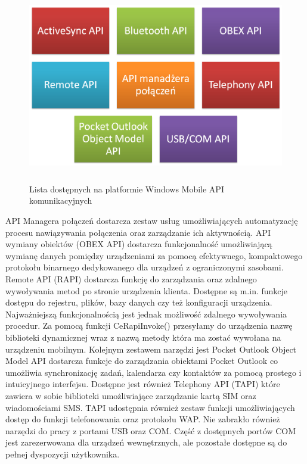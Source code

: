 \begin{figure}[h!]
 \centering
 \includegraphics[height=85mm]{../images/ch03/wm_comm_api.png}
 \caption{Lista dostępnych na platformie Windows Mobile API komunikacyjnych}
 \label{fig:WMCommunicationAPI}
\end{figure}

API Managera połączeń dostarcza zestaw usług umożliwiających automatyzację procesu
nawiązywania połączenia oraz zarządzanie ich aktywnością. API wymiany obiektów
(OBEX API) dostarcza funkcjonalność umożliwiającą wymianę danych pomiędzy
urządzeniami za pomocą efektywnego, kompaktowego protokołu binarnego
dedykowanego dla urządzeń z ograniczonymi zasobami. Remote API (RAPI) dostarcza
funkcję do zarządzania oraz zdalnego wywoływania metod po stronie
urządzenia klienta. Dostępne są m.in. funkcje dostępu do rejestru, plików, bazy
danych czy też konfiguracji urządzenia. Najważniejszą funkcjonalnością jest
jednak możliwość zdalnego wywoływania procedur. Za pomocą funkcji
CeRapiInvoke() przesyłamy do urządzenia nazwę biblioteki dynamicznej wraz z
nazwą metody która ma zostać wywołana na urządzeniu mobilnym. Kolejnym zestawem
narzędzi jest Pocket Outlook Object Model API dostarcza funkcje do zarządzania
obiektami Pocket Outlook  co umożliwia synchronizację zadań, kalendarza czy
kontaktów za pomocą prostego i intuicyjnego interfejsu. Dostępne jest również
Telephony API (TAPI) które zawiera w sobie biblioteki umożliwiające zarządzanie
kartą SIM oraz wiadomościami SMS. TAPI udostępnia również zestaw funkcji
umożliwiających dostęp do funkcji telefonowania oraz protokołu WAP. Nie
zabrakło również narzędzi do pracy z portami USB oraz COM. Część z dostępnych portów COM
jest zarezerwowana dla urządzeń wewnętrznych, ale pozostałe dostępne są do
pełnej dyspozycji użytkownika.

